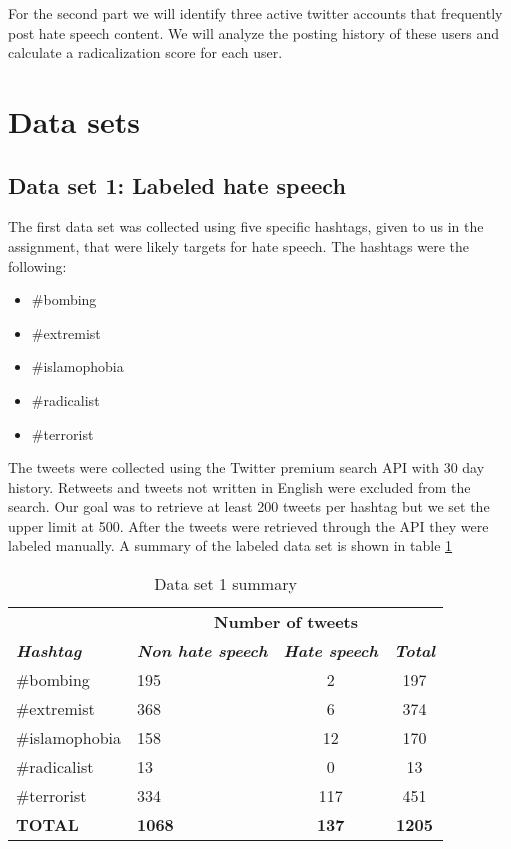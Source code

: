\documentclass[conference]{IEEEtran}
\begin{document}
For the second part we will identify three active twitter accounts that frequently post 
hate speech content. We will analyze the posting history of these users and calculate a 
radicalization score for each user. 

\section{Data sets}
\subsection{Data set 1: Labeled hate speech}
The first data set was collected using five specific hashtags, given to us in the assignment,
that were likely targets for hate speech. The hashtags were the following: 
\begin{itemize}
    \item \#bombing
    \item \#extremist
    \item \#islamophobia
    \item \#radicalist
    \item \#terrorist    
\end{itemize}

The tweets were collected using the Twitter premium search API with 30 day history. Retweets 
and tweets not written in English were excluded from the search. Our goal was to retrieve at least 
200 tweets per hashtag but we set the upper limit at 500. After the tweets were retrieved  
through the API they were labeled manually. A summary of the labeled data set is shown in table 
\ref{tab:data_set_1_summary}

\begin{table}[!ht]
    \def\arraystretch{1.2}%
    \begin{center}
      \caption{Data set 1 summary}
      \label{tab:data_set_1_summary}
      \begin{tabular}{l l c c}
        \hline
        &\multicolumn{3}{c}{\textbf{Number of tweets}} \\
        \textbf{\textit{Hashtag}}& \textbf{\textit{Non hate speech}}& \textbf{\textit{Hate speech}} & \textbf{\textit{Total}}  \\
        \cline{2-4} 
        \hline
        \#bombing & 195 & 2 & 197\\
        \#extremist & 368 & 6 & 374\\
        \#islamophobia & 158 & 12 & 170\\
        \#radicalist & 13 & 0 & 13\\
        \#terrorist & 334 & 117 & 451\\
        \hline
        \textbf{TOTAL} & \textbf{1068} & \textbf{137} & \textbf{1205}\\
        \hline
      \end{tabular}  
    \end{center}
  \end{table}
\end{document}
